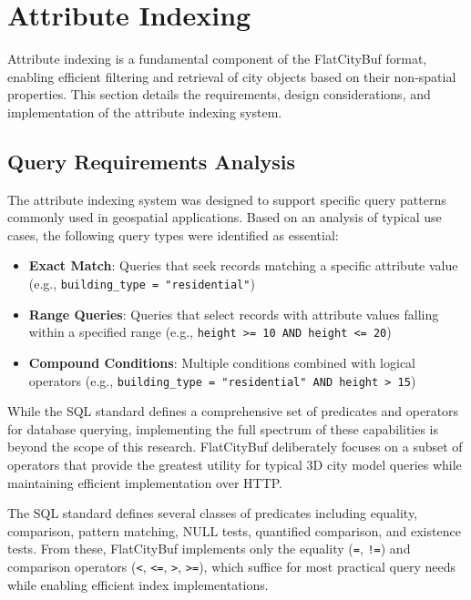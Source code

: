 
\section{Attribute Indexing}
\label{methodology:attribute_index}

Attribute indexing is a fundamental component of the FlatCityBuf format, enabling efficient filtering and retrieval of city objects based on their non-spatial properties. This section details the requirements, design considerations, and implementation of the attribute indexing system.

\subsection{Query Requirements Analysis}
\label{methodology:attribute_index:query_requirements}

The attribute indexing system was designed to support specific query patterns commonly used in geospatial applications. Based on an analysis of typical use cases, the following query types were identified as essential:

\begin{itemize}
    \item \textbf{Exact Match}: Queries that seek records matching a specific attribute value (e.g., \texttt{building\_type = "residential"})
    \item \textbf{Range Queries}: Queries that select records with attribute values falling within a specified range (e.g., \texttt{height >= 10 AND height <= 20})
    \item \textbf{Compound Conditions}: Multiple conditions combined with logical operators (e.g., \texttt{building\_type = "residential" AND height > 15})
\end{itemize}

While the SQL standard \citep{iso_9075_2_2023} defines a comprehensive set of predicates and operators for database querying, implementing the full spectrum of these capabilities is beyond the scope of this research. FlatCityBuf deliberately focuses on a subset of operators that provide the greatest utility for typical 3D city model queries while maintaining efficient implementation over HTTP.

The SQL standard defines several classes of predicates including equality, comparison, pattern matching, NULL tests, quantified comparison, and existence tests. From these, FlatCityBuf implements only the equality (\texttt{=}, \texttt{!=}) and comparison operators (\texttt{<}, \texttt{<=}, \texttt{>}, \texttt{>=}), which suffice for most practical query needs while enabling efficient index implementations.

